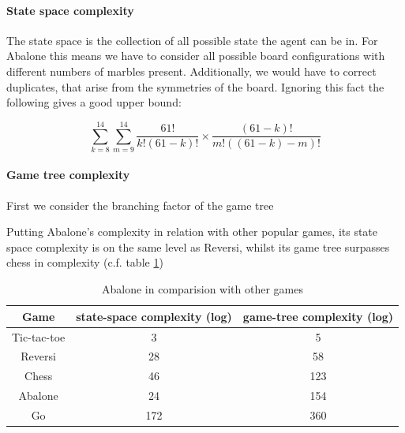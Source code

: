 \documentclass{llncs}
\begin{document}
\paragraph{State space complexity}

The state space is the collection of all possible state the agent can be in.\cite[p. 150]{russell_artificial_2021} For Abalone this means we have to consider all possible board configurations with different numbers of marbles present. Additionally, we would have to correct duplicates, that arise from the symmetries of the board. Ignoring this fact the following gives a good upper bound: \cite{lemmens_constructing_2005}

$$
  \sum_{k=8}^{14}\sum_{m=9}^{14}\frac{61!}{k!(61-k)!}\times\frac{(61-k)!}{m!((61-k)-m)!}
$$

\paragraph{Game tree complexity} First we consider the branching factor of the game tree

Putting Abalone's complexity in relation with other popular games, its state space complexity is on the same level as Reversi, whilst its game tree surpasses chess in complexity (c.f. table \ref{complexity_table})

\begin{table}
  \begin{center}
    \begin{tabular}{ | c | c | c | }
      \hline
      Game        & state-space complexity (log) & game-tree complexity (log) \\
      \hline
      Tic-tac-toe & 3                            & 5                          \\
      \hline
      Reversi     & 28                           & 58                         \\
      \hline
      Chess       & 46                           & 123                        \\
      \hline
      Abalone     & 24                           & 154                        \\
      \hline
      Go          & 172                          & 360                        \\
      \hline
    \end{tabular}
  \end{center}
  \caption{Abalone in comparision with other games \cite{chorus_implementing_2009}}
  \label{complexity_table}
\end{table}
\end{document}
